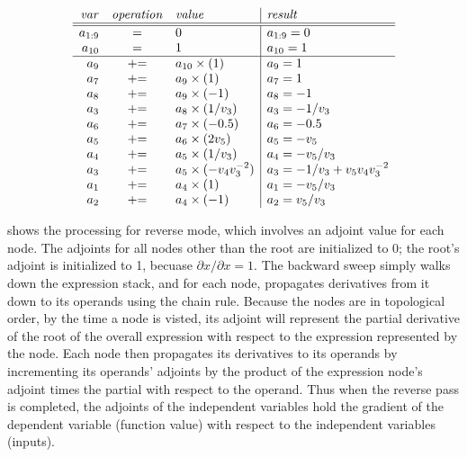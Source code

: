 \documentclass[10pt]{article}
\begin{document}
\begin{figure}
\[
\begin{array}{rcl|l}
{\it var} & {\it operation} & {\it value} & {\it result}
\\ \hline \hline
a_{1:9} & = & 0 & a_{1:9} = 0
\\
a_{10} & = & 1 & a_{10} = 1
\\ \hline
a_{9} & {+}{=} & a_{10} \times (1) & a_9 = 1
\\
a_{7} & {+}{=} & a_9 \times (1) & a_7 = 1
\\
a_{8} & {+}{=} & a_9 \times (-1) & a_8 = -1
\\
a_{3} & {+}{=} & a_8 \times (1 / v_3) & a_3 = -1 / v_3
\\
a_{6} & {+}{=} & a_7 \times (-0.5) & a_6 = -0.5
\\
a_{5} & {+}{=} & a_6 \times (2 v_5) & a_5 = -v_5
\\
a_{4} & {+}{=} & a_5 \times (1 / v_3) & a_4 = -v_5 / v_3
\\
a_{3} & {+}{=} & a_5 \times (-v_4 v_3^{-2}) & a_3 = -1 / v_3 + v_5 v_4 v_3^{-2}
\\
a_{1} & {+}{=} & a_4 \times (1) & a_1 = -v_5 / v_3
\\
a_{2} & {+}{=} & a_4 \times (-1) & a_2 = v_5 / v_3
\end{array}
\]
\end{figure}
%
 shows the processing for reverse mode,
which involves an adjoint value for each node.  The adjoints for all
nodes other than the root are initialized to 0; the root's adjoint is
initialized to 1, becuase $\partial x / \partial x = 1$.  The backward
sweep simply walks down the expression stack, and for each node,
propagates derivatives from it down to its operands using the chain
rule.  Because the nodes are in topological order, by the time a node
is visted, its adjoint will represent the partial derivative of the
root of the overall expression with respect to the expression
represented by the node.  Each node then propagates its derivatives to
its operands by incrementing its operands' adjoints by the product of
the expression node's adjoint times the partial with respect to the
operand.  Thus when the reverse pass is completed, the adjoints of the
independent variables hold the gradient of the dependent variable
(function value) with respect to the independent variables (inputs).
\end{document}
